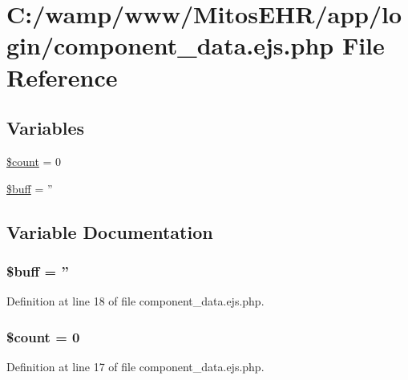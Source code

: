 \hypertarget{login_2component__data_8ejs_8php}{\section{\-C\-:/wamp/www/\-Mitos\-E\-H\-R/app/login/component\-\_\-data.ejs.\-php \-File \-Reference}
\label{login_2component__data_8ejs_8php}
}
\subsection*{\-Variables}
\begin{DoxyCompactItemize}
\item 
\hyperlink{login_2component__data_8ejs_8php_af789423037bbc89dc7c850e761177570}{\$count} = 0
\item 
\hyperlink{login_2component__data_8ejs_8php_aee88b745b9e14ca8b4227da600cea0b8}{\$buff} = ''
\end{DoxyCompactItemize}


\subsection{\-Variable \-Documentation}
\hypertarget{login_2component__data_8ejs_8php_aee88b745b9e14ca8b4227da600cea0b8}{
\subsubsection[{\$buff}]{\setlength{\rightskip}{0pt plus 5cm}\$buff = ''}}\label{login_2component__data_8ejs_8php_aee88b745b9e14ca8b4227da600cea0b8}


\-Definition at line 18 of file component\-\_\-data.\-ejs.\-php.

\hypertarget{login_2component__data_8ejs_8php_af789423037bbc89dc7c850e761177570}{
\subsubsection[{\$count}]{\setlength{\rightskip}{0pt plus 5cm}\$count = 0}}\label{login_2component__data_8ejs_8php_af789423037bbc89dc7c850e761177570}


\-Definition at line 17 of file component\-\_\-data.\-ejs.\-php.


